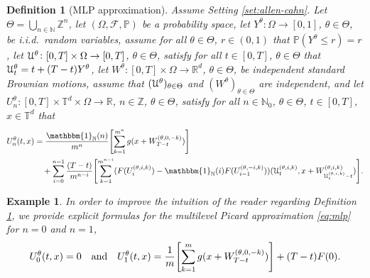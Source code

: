 \documentclass{article}
\numberwithin{equation}{section}
\newcommand{\T}{\mathbb{T}}
\newcommand{\R}{\mathbb{R}}
\newcommand{\N}{\mathbb{N}}
\newcommand{\Z}{\mathbb{Z}}
\renewcommand{\P}{\mathbb{P}}
\newcommand{\cF}{\mathcal{F}}
\newcommand{\fu}{Y}
\newcommand{\mlp}{U}
\newcommand{\1}{\mathbbm{1}}
\DeclarePairedDelimiter{\br}{[}{]}
\DeclarePairedDelimiter{\pr}{(}{)}
\newcommand{\E}[1]{{\mathbb{E}\left[ #1 \right]}} %
\newtheorem{example}[theorem]{Example}
\newtheorem{definition}[theorem]{Definition}
\begin{document}
\begin{definition}[MLP approximation]\label{def:MLP}
Assume Setting \ref{set:allen-cahn}. Let $\Theta = \bigcup_{n\in\N}\! \Z^n$, let $(\Omega,\cF,\P)$ be a probability space,
let $\fu^\theta \colon \Omega \to [0,1]$, $\theta \in \Theta$, be i.i.d.\ random variables, 
assume for all $\theta\in\Theta$, $r\in (0,1)$ that $\P(\fu^\theta \le r ) = r$,
let $\EuScript{U}^\theta \colon [0,T]\times \Omega\to [0,T]$, $\theta\in\Theta$, satisfy for all $t\in [0,T]$, $\theta\in\Theta$ that $\EuScript{U}_t^\theta = t + (T-t)\fu^\theta$, 
let $W^\theta \colon [0,T] \times \Omega \to \R^d$, $\theta\in\Theta$, be independent standard Brownian motions,
assume that $(\EuScript{U}^\theta)_{\theta\in\Theta}$ and $(W^\theta)_{\theta\in\Theta}$ are independent,
and let $\mlp_n^\theta \colon [0,T] \times \T^d\times \Omega\to \R$, 
$n\in\Z$, 
$\theta\in\Theta$, satisfy for all 
$n\in\N_0$, 
$\theta\in\Theta$, $t\in[0,T]$, $x\in\T^d$ that 
\begin{equation}\label{eq:mlp}
\begin{split}
\mlp_n^\theta(t,x) 
& = \frac{\1_\N(n)}{m^n} \br[\Bigg]{ \sum_{k=1}^{m^n} g\pr[\bigl]{x + W_{T-t}^{(\theta,0,-k)}} } \\
& \quad + \sum_{i=0}^{n-1} \frac{(T-t)}{m^{n-i}}\br[\Bigg]{ \sum_{k=1}^{m^{n-i}} \pr[]{ F(\mlp_i^{(\theta,i,k)}) - \1_\N(i) F( \mlp_{i-1}^{(\theta,-i,k)}) } \pr[]{ \EuScript{U}_t^{(\theta,i,k)}, x + W_{\EuScript{U}_t^{(\theta,i,k)}-t}^{(\theta,i,k)} } }.
\end{split}
\end{equation}
\end{definition}

\begin{example}
In order to improve the intuition of the reader regarding Definition \ref{def:MLP}, we provide explicit formulas for the multilevel Picard approximation \eqref{eq:mlp} for $n=0$ and $n=1$,
\begin{equation}
    U^\theta_0(t,x) = 0 \quad \text{and} \quad U^\theta_1(t,x) = \frac{1}{m} \br[\Bigg]{ \sum_{k=1}^{m} g\pr[\bigl]{x + W_{T-t}^{(\theta,0,-k)}} } + (T-t) F(0). 
\end{equation}
\end{example}
\end{document}
